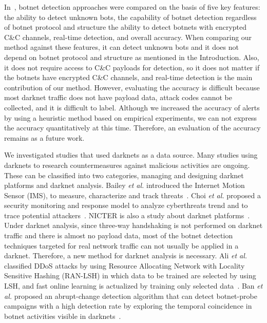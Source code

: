 \documentclass[letterpaper]{sig-alternate-10pt}
\begin{document}
In~\cite{Feily}, botnet detection approaches were compared on the basis of five key features: the ability to detect unknown bots, the capability of botnet detection regardless of botnet protocol and structure the ability to detect botnets with encrypted C\&C channels, real-time detection, and overall accuracy.
When comparing our method against these features, it can detect unknown bots and it does not depend on botnet protocol and structure as mentioned in the Introduction.
Also, it does not require access to C\&C payloads for detection, so it does not matter if the botnets have encrypted C\&C channels, and real-time detection is the main contribution of our method.
However, evaluating the accuracy is difficult because most darknet traffic does not have payload data, attack codes cannot be collected, and it is difficult to label.
Although we increased the accuracy of alerts by using a heuristic method based on empirical experiments, we can not express the accuracy quantitatively at this time.
Therefore, an evaluation of the accuracy remains as a future work.

We investigated studies that used darknets as a data source.
Many studies using darknets to research countermeasures against malicious activities are ongoing.
These can be classified into two categories, managing and designing darknet platforms and darknet analysis.
Bailey {\it et al.} introduced the Internet Motion Sensor (IMS), to measure, characterize and track threats~\cite{Bailey, Bailey2}.
Choi {\it et al.} proposed a security monitoring and response model to analyze cyberthreats trend and to trace potential attackers~\cite{Choi}.
NICTER is also a study about darknet platforms~\cite{Nakao}.
Under darknet analysis, since three-way handshaking is not performed on darknet traffic and there is almost no payload data, most of the botnet detection techniques targeted for real network traffic can not usually be applied in a darknet.
Therefore, a new method for darknet analysis is necessary.
Ali {\it et al.} classified DDoS attacks by using Resource Allocating Network with Locality Sensitive Hashing (RAN-LSH) in which data to be trained are selected by using LSH, and fast online learning is actualized by training only selected data~\cite{Ali}.
Ban {\it et al.} proposed an abrupt-change detection algorithm that can detect botnet-probe campaigns with a high detection rate by exploring the temporal coincidence in botnet activities visible in darknets~\cite{Ban}.
\end{document}
